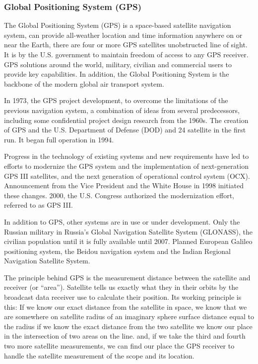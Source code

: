\documentclass[12pt,a4paper]{article}
\begin{document}
\subsubsection{Global Positioning System (GPS)} %
\label{ssub:global_positioning_system_gps_}
The Global Positioning System (GPS) is a space-based satellite navigation system, can provide all-weather location and time information anywhere on or near the Earth, there are four or more GPS satellites unobstructed line of sight. It is by the U.S. government to maintain freedom of access to any GPS receiver. GPS solutions around the world, military, civilian and commercial users to provide key capabilities. In addition, the Global Positioning System is the backbone of the modern global air transport system. \cite{wiki-gps}

In 1973, the GPS project development, to overcome the limitations of the previous navigation system, a combination of ideas from several predecessors, including some confidential project design research from the 1960s. \cite{national1995global} The creation of GPS and the U.S. Department of Defense (DOD) and 24 satellite in the first run. It began full operation in 1994.

Progress in the technology of existing systems and new requirements have led to efforts to modernize the GPS system and the implementation of next-generation GPS III satellites, and the next generation of operational control system (OCX). \cite{gpsocx} Announcement from the Vice President and the White House in 1998 initiated these changes. 2000, the U.S. Congress authorized the modernization effort, referred to as GPS III.

In addition to GPS, other systems are in use or under development. Only the Russian military in Russia's Global Navigation Satellite System (GLONASS), the civilian population until it is fully available until 2007. Planned European Galileo positioning system, the Beidou navigation system and the Indian Regional Navigation Satellite System.

The principle behind GPS is the measurement distance between the satellite and receiver (or ``area''). Satellite tells us exactly what they in their orbits by the broadcast data receiver use to calculate their position. Its working principle is this: If we know our exact distance from the satellite in space, we know that we are somewhere on satellite radius of an imaginary sphere surface distance equal to the radius if we know the exact distance from the two satellite we know our place in the intersection of two areas on the line. and, if we take the third and fourth two more satellite measurements, we can find our place the GPS receiver to handle the satellite measurement of the scope and its location. \cite{gpsprimer}
\end{document}
